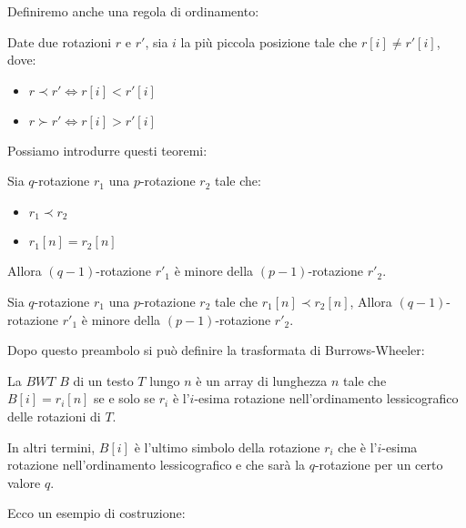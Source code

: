 Definiremo anche una regola di ordinamento:
\begin{definizione}
    Date due rotazioni $r$ e $r'$, sia $i$ la più piccola posizione tale che
    $r[i]\ne r'[i]$, dove:
    \begin{itemize}
        \item $r \prec r'\iff r[i] < r'[i]$
        \item $r \succ r'\iff r[i] > r'[i]$
    \end{itemize}
\end{definizione}
Possiamo introdurre questi teoremi:
\begin{teorema}
    Sia $q$-rotazione $r_1$ una $p$-rotazione $r_2$ tale che:
    \begin{itemize}
        \item $r_1 \prec r_2$
        \item $r_1[n] = r_2[n]$
    \end{itemize}
    Allora $(q - 1)$-rotazione $r'_1$ è minore della $(p - 1)$-rotazione $r'_2$.
\end{teorema}
\begin{teorema}
    Sia $q$-rotazione $r_1$ una $p$-rotazione $r_2$ tale che $r_1[n] \prec r_2[n]$,
    Allora $(q - 1)$-rotazione $r'_1$ è minore della $(p - 1)$-rotazione $r'_2$.
\end{teorema}
Dopo questo preambolo si può definire la trasformata di Burrows-Wheeler:
\begin{definizione}
    La $BWT$ $B$ di un testo $T$ lungo $n$ è un array di lunghezza $n$ tale che
    $B[i] = r_i[n]$ se e solo se $r_i$ è l'$i$-esima rotazione nell'ordinamento
    lessicografico delle rotazioni di $T$.

    In altri termini, $B[i]$ è l'ultimo simbolo della rotazione $r_i$ che è
    l'$i$-esima rotazione nell'ordinamento lessicografico e che sarà la
    $q$-rotazione per un certo valore $q$.
\end{definizione}
Ecco un esempio di costruzione:
